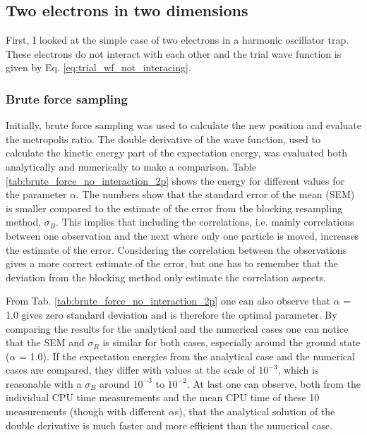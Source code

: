 \subsection{Two electrons in two dimensions}

First, I looked at the simple case of two electrons in a harmonic oscillator trap. These electrons do not interact with each other and the trial wave function is given by Eq. \ref{eq:trial_wf_not_interacing}. 

\subsubsection{Brute force sampling}

Initially, brute force sampling was used to calculate the new position and evaluate the metropolis ratio. The double derivative of the wave function, used to calculate the kinetic energy part of the expectation energy, was evaluated both analytically and numerically to make a comparison. Table \ref{tab:brute_force_no_interaction_2p} shows the energy for different values for the parameter $\alpha$. The numbers show that the standard error of the mean (SEM) is smaller compared to the estimate of the error from the blocking resampling method, $\sigma_B$. This implies that including the correlations, i.e. mainly correlations between one observation and the next where only one particle is moved, increases the estimate of the error. Considering the correlation between the observations gives a more correct estimate of the error, but one has to remember that the deviation from the blocking method only estimate the correlation aspects.

From Tab. \ref{tab:brute_force_no_interaction_2p} one can also observe that $\alpha $ = 1.0 gives zero standard deviation and is therefore the optimal parameter. By comparing the results for the analytical and the numerical cases one can notice that the SEM and $\sigma_B$ is similar for both cases, especially around the ground state ($\alpha$ = 1.0). If the expectation energies from the analytical case and the numerical cases are compared, they differ with values at the scale of $10^{-3}$, which is reasonable with a $\sigma_B$ around $10^{-3}$ to $10^{-2}$. At last one can observe, both from the individual CPU time measurements and the mean CPU time of these 10 measurements (though with different $\alpha$s), that the analytical solution of the double derivative is much faster and more efficient than the numerical case. 

